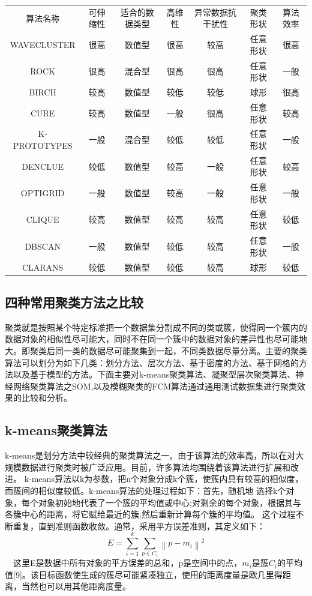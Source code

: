 \begin{longtable}[]{ ccccccc }
算法名称 & 可伸缩性 & 适合的数据类型 & 高维性 & 异常数据抗干扰性 &
聚类形状 & 算法效率\tabularnewline
WAVECLUSTER & 很高 & 数值型 & 很高 & 较高 & 任意形状 &
很高\tabularnewline
ROCK & 很高 & 混合型 & 很高 & 很高 & 任意形状 & 一般\tabularnewline
BIRCH & 较高 & 数值型 & 较低 & 较低 & 球形 & 很高\tabularnewline
CURE & 较高 & 数值型 & 一般 & 很高 & 任意形状 & 较高\tabularnewline
K-PROTOTYPES & 一般 & 混合型 & 较低 & 较低 & 任意形状 &
一般\tabularnewline
DENCLUE & 较低 & 数值型 & 较高 & 一般 & 任意形状 & 较高\tabularnewline
OPTIGRID & 一般 & 数值型 & 较高 & 一般 & 任意形状 & 一般\tabularnewline
CLIQUE & 较高 & 数值型 & 较高 & 较高 & 任意形状 & 较低\tabularnewline
DBSCAN & 一般 & 数值型 & 较低 & 较高 & 任意形状 & 一般\tabularnewline
CLARANS & 较低 & 数值型 & 较低 & 较高 & 球形 & 较低\tabularnewline
\end{longtable}

\subsection{四种常用聚类方法之比较}\label{ux56dbux79cdux5e38ux7528ux805aux7c7bux65b9ux6cd5ux4e4bux6bd4ux8f83}

​
聚类就是按照某个特定标准把一个数据集分割成不同的类或簇，使得同一个簇内的数据对象的相似性尽可能大，同时不在同一个簇中的数据对象的差异性也尽可能地大。即聚类后同一类的数据尽可能聚集到一起，不同类数据尽量分离。
​
主要的聚类算法可以划分为如下几类：划分方法、层次方法、基于密度的方法、基于网格的方法以及基于模型的方法。下面主要对k-means聚类算法、凝聚型层次聚类算法、神经网络聚类算法之SOM,以及模糊聚类的FCM算法通过通用测试数据集进行聚类效果的比较和分析。

\subsection{k-means聚类算法}\label{k-meansux805aux7c7bux7b97ux6cd5}

k-means是划分方法中较经典的聚类算法之一。由于该算法的效率高，所以在对大规模数据进行聚类时被广泛应用。目前，许多算法均围绕着该算法进行扩展和改进。
k-means算法以k为参数，把n个对象分成k个簇，使簇内具有较高的相似度，而簇间的相似度较低。k-means算法的处理过程如下：首先，随机地
选择k个对象，每个对象初始地代表了一个簇的平均值或中心;对剩余的每个对象，根据其与各簇中心的距离，将它赋给最近的簇;然后重新计算每个簇的平均值。
这个过程不断重复，直到准则函数收敛。通常，采用平方误差准则，其定义如下：
\[
E=\sum_{i=1}^{k}\sum_{p\in C_i}\left\|p-m_i\right\|^2
\]
　这里E是数据中所有对象的平方误差的总和，p是空间中的点，$m_i$是簇$C_i$的平均值{[}9{]}。该目标函数使生成的簇尽可能紧凑独立，使用的距离度量是欧几里得距离，当然也可以用其他距离度量。

